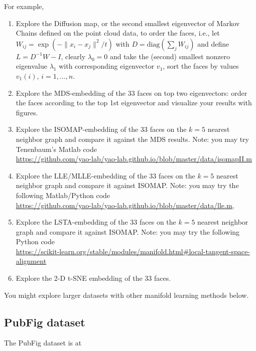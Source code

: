 \documentclass[11pt]{article}
\def\diag{{\mathrm{diag}}}
\begin{document}
\noindent For example, 
\begin{enumerate}
\item Explore the Diffusion map, or the second smallest eigenvector of Markov Chains defined on the point cloud data, to order the faces, i.e., let $W_{ij}=\exp(-\|x_i - x_j\|^2/t)$ with $D=\diag(\sum_j W_{ij})$ and define $L=D^{-1} W - I$, clearly $\lambda_0=0$ and take the (second) smallest nonzero eigenvalue $\lambda_1$ with corresponding eigenvector $v_1$, sort the faces by values $v_1(i)$, $i=1,\ldots,n$.  
\item Explore the MDS-embedding of the 33 faces on top two eigenvectors: order the faces according to the top 1st eigenvector and visualize your results with figures. 
\item Explore the ISOMAP-embedding of the 33 faces on the $k=5$ nearest neighbor graph and compare it against the MDS results. Note: you may try Tenenbaum's Matlab code \\
{\url{https://github.com/yao-lab/yao-lab.github.io/blob/master/data/isomapII.m}}
\item Explore the LLE/MLLE-embedding of the 33 faces on the $k=5$ nearest neighbor graph and compare it against ISOMAP. Note: you may try the following Matlab/Python code \\
{\url{https://github.com/yao-lab/yao-lab.github.io/blob/master/data/lle.m}}, %
\item Explore the LSTA-embedding of the 33 faces on the $k=5$ nearest neighbor graph and compare it against ISOMAP. Note: you may try the following Python code \\
{\url{https://scikit-learn.org/stable/modules/manifold.html#local-tangent-space-alignment}}
\item Explore the 2-D t-SNE embedding of the 33 faces. %
\end{enumerate}


You might explore larger datasets with other manifold learning methods below.  

\subsection{PubFig dataset} 
The PubFig dataset is at 
\end{document}
